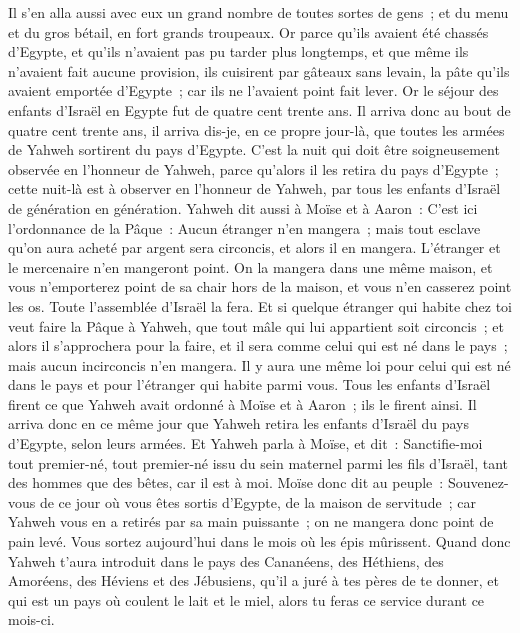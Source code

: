 \begin{multicols}{2}
Il s'en alla aussi avec eux un grand nombre de toutes sortes de gens~; et du menu et du gros bétail, en fort grands troupeaux.
 Or parce qu'ils avaient été chassés d'Egypte, et qu'ils n'avaient pas pu tarder plus longtemps, et que même ils n'avaient fait aucune provision, ils cuisirent par gâteaux sans levain, la pâte qu'ils avaient emportée d'Egypte~; car ils ne l'avaient point fait lever.
Or le séjour des enfants d'Israël en Egypte fut de quatre cent trente ans.
Il arriva donc au bout de quatre cent trente ans, il arriva dis-je, en ce propre jour-là, que toutes les armées de Yahweh sortirent du pays d'Egypte.
C'est la nuit qui doit être soigneusement observée en l'honneur de Yahweh, parce qu'alors il les retira du pays d'Egypte~; cette nuit-là est à observer en l'honneur de Yahweh, par tous les enfants d'Israël de génération en génération.
Yahweh dit aussi à Moïse et à Aaron~: C'est ici l'ordonnance de la Pâque~: Aucun étranger n'en mangera~;
mais tout esclave qu'on aura acheté par argent sera circoncis, et alors il en mangera.
L'étranger et le mercenaire n'en mangeront point.
On la mangera dans une même maison, et vous n'emporterez point de sa chair hors de la maison, et vous n'en casserez point les os.
Toute l'assemblée d'Israël la fera.
Et si quelque étranger qui habite chez toi veut faire la Pâque à Yahweh, que tout mâle qui lui appartient soit circoncis~; et alors il s'approchera pour la faire, et il sera comme celui qui est né dans le pays~; mais aucun incirconcis n'en mangera.
Il y aura une même loi pour celui qui est né dans le pays et pour l'étranger qui habite parmi vous.
Tous les enfants d'Israël firent ce que Yahweh avait ordonné à Moïse et à Aaron~; ils le firent ainsi.
Il arriva donc en ce même jour que Yahweh retira les enfants d'Israël du pays d'Egypte, selon leurs armées.
\VerseOne{}Et Yahweh parla à Moïse, et dit~:
Sanctifie-moi tout premier-né, tout premier-né issu du sein maternel parmi les fils d'Israël, tant des hommes que des bêtes, car il est à moi.
Moïse donc dit au peuple~: Souvenez-vous de ce jour où vous êtes sortis d'Egypte, de la maison de servitude~; car Yahweh vous en a retirés par sa main puissante~; on ne mangera donc point de pain levé.
Vous sortez aujourd'hui dans le mois où les épis mûrissent.
Quand donc Yahweh t'aura introduit dans le pays des Cananéens, des Héthiens, des Amoréens, des Héviens et des Jébusiens, qu'il a juré à tes pères de te donner, et qui est un pays où coulent le lait et le miel, alors tu feras ce service durant ce mois-ci.

\end{multicols}
